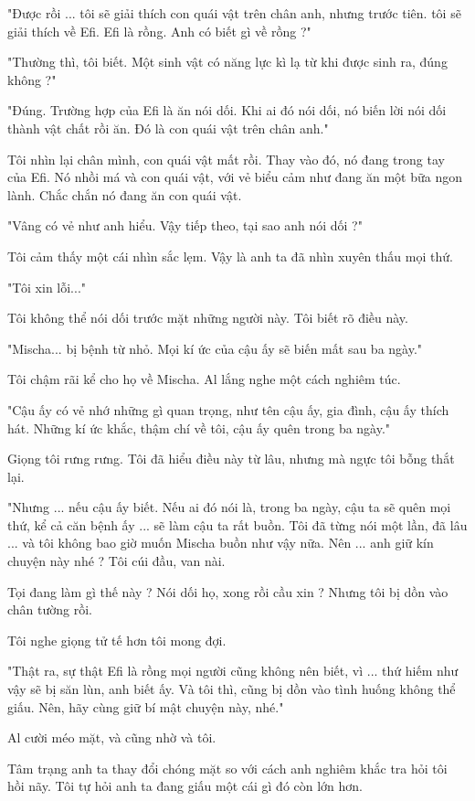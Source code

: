 "Được rồi ... tôi sẽ giải thích con quái vật trên chân anh, nhưng trước tiên. tôi sẽ giải thích về Efi. Efi là rồng. Anh có biết gì về rồng ?"

"Thường thì, tôi biết. Một sinh vật có năng lực kì lạ từ khi được sinh ra, đúng không ?"

"Đúng. Trường hợp của Efi là ăn nói dối. Khi ai đó nói dối, nó biến lời nói dối thành vật chất rồi ăn. Đó là con quái vật trên chân anh."

Tôi nhìn lại chân mình, con quái vật mất rồi. Thay vào đó, nó đang trong tay của Efi. Nó nhồi má và con quái vật, với vẻ biểu cảm như đang ăn một bữa ngon lành. Chắc chắn nó đang ăn con quái vật.

"Vâng có vẻ như anh hiểu. Vậy tiếp theo, tại sao anh nói dối ?"

Tôi cảm thấy một cái nhìn sắc lẹm. Vậy là anh ta đã nhìn xuyên thấu mọi thứ.

"Tôi xin lỗi..."

Tôi không thể nói dối trước mặt những người này. Tôi biết rõ điều này.

"Mischa... bị bệnh từ nhỏ. Mọi kí ức của cậu ấy sẽ biến mất sau ba ngày."

Tôi chậm rãi kể cho họ về Mischa. Al lắng nghe một cách nghiêm túc.

"Cậu ấy có vẻ nhớ những gì quan trọng, như tên cậu ấy, gia đình, cậu ấy thích hát. Những kí ức khắc, thậm chí về tôi, cậu ấy quên trong ba ngày."

Giọng tôi rưng rưng. Tôi đã hiểu điều này từ lâu, nhưng mà ngực tôi bỗng thắt lại.

"Nhưng ... nếu cậu ấy biết. Nếu ai đó nói là, trong ba ngày, cậu ta sẽ quên mọi thứ, kể cả căn bệnh ấy ... sẽ làm cậu ta rất buồn. Tôi đã từng nói một lần, đã lâu ... và tôi không bao giờ muốn Mischa buồn như vậy nữa. Nên ... anh giữ kín chuyện này nhé ? Tôi cúi đầu, van nài.

Tọi đang làm gì thế này ? Nói dối họ, xong rồi cầu xin ? Nhưng tôi bị dồn vào chân tường rồi.

Tôi nghe giọng tử tế hơn tôi mong đợi.

"Thật ra, sự thật Efi là rồng mọi người cũng không nên biết, vì ... thứ hiếm như vậy sẽ bị săn lùn, anh biết ấy. Và tôi thì, cũng bị dồn vào tình huống không thể giấu. Nên, hãy cùng giữ bí mật chuyện này, nhé."

Al cười méo mặt, và cũng nhờ và tôi.

Tâm trạng anh ta thay đổi chóng mặt so với cách anh nghiêm khắc tra hỏi tôi hồi nãy. Tôi tự hỏi anh ta đang giấu một cái gì đó còn lớn hơn.

